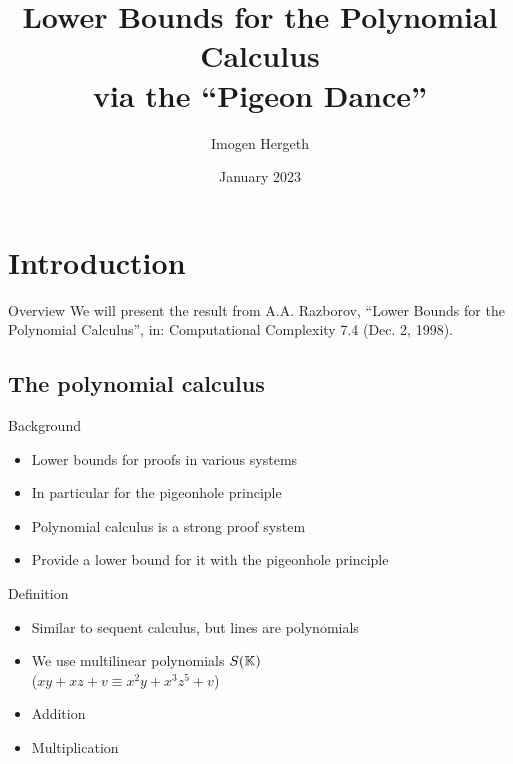 \documentclass[xcolor={dvipsnames}, aspectratio=169]{beamer}
\title{Lower Bounds for the Polynomial Calculus\\via the ``Pigeon Dance''}
\author{Imogen Hergeth}
\date{January 2023}
\begin{document}
\maketitle

\section{Introduction}

\begin{frame}{Overview}
    We will present the result from A.A. Razborov, ``Lower Bounds for the Polynomial Calculus'',
    in: Computational Complexity 7.4 (Dec. 2, 1998).

    \tableofcontents[hideallsubsections]
\end{frame}

\subsection{The polynomial calculus}

\begin{frame}{Background}
    \begin{itemize}[<+->]
        \item Lower bounds for proofs in various systems
        \item In particular for the pigeonhole principle
        \item Polynomial calculus is a strong proof system
        \item Provide a lower bound for it with the pigeonhole principle
    \end{itemize}
\end{frame}

\begin{frame}{Definition}
    \begin{itemize}[<+->]
        \item Similar to sequent calculus, but lines are polynomials
        \item We use multilinear polynomials $S(\KK)$\\
            ($xy + xz + v \equiv x^2y + x^3z^5 + v$)
        \item Addition
        \begin{prooftree}
        \end{prooftree}
        \item Multiplication
        \begin{prooftree}
        \end{prooftree}
    \end{itemize}
\end{frame}
\end{document}
